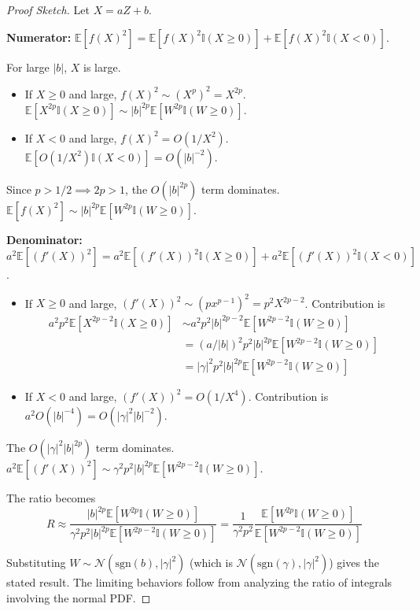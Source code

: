 \documentclass[11pt]{article}
\begin{document}
\begin{proof}[Proof Sketch]
Let $X = aZ+b$.

\textbf{Numerator:} $\mathbb{E}[f(X)^2] = \mathbb{E}[f(X)^2 \mathbb{I}(X \ge 0)] + \mathbb{E}[f(X)^2 \mathbb{I}(X < 0)]$.

For large $|b|$, $X$ is large.
\begin{itemize}
    \item If $X \ge 0$ and large, $f(X)^2 \sim (X^p)^2 = X^{2p}$. $\mathbb{E}[X^{2p}\mathbb{I}(X \ge 0)] \sim |b|^{2p}\mathbb{E}[W^{2p}\mathbb{I}(W \ge 0)]$.
    \item If $X < 0$ and large, $f(X)^2 = O(1/X^2)$. $\mathbb{E}[O(1/X^2)\mathbb{I}(X < 0)] = O(|b|^{-2})$.
\end{itemize}

Since $p > 1/2 \implies 2p > 1$, the $O(|b|^{2p})$ term dominates.
$\mathbb{E}[f(X)^2] \sim |b|^{2p} \mathbb{E}[W^{2p} \mathbb{I}(W \ge 0)]$.

\textbf{Denominator:} $a^2 \mathbb{E}[(f'(X))^2] = a^2 \mathbb{E}[(f'(X))^2 \mathbb{I}(X \ge 0)] + a^2 \mathbb{E}[(f'(X))^2 \mathbb{I}(X < 0)]$.

\begin{itemize}
    \item If $X \ge 0$ and large, $(f'(X))^2 \sim (px^{p-1})^2 = p^2 X^{2p-2}$. Contribution is 
    \begin{align}
    a^2 p^2 \mathbb{E}[X^{2p-2}\mathbb{I}(X \ge 0)] &\sim a^2 p^2 |b|^{2p-2}\mathbb{E}[W^{2p-2}\mathbb{I}(W \ge 0)] \\
    &= (a/|b|)^2 p^2 |b|^{2p} \mathbb{E}[W^{2p-2}\mathbb{I}(W \ge 0)] \\
    &= |\gamma|^2 p^2 |b|^{2p} \mathbb{E}[W^{2p-2}\mathbb{I}(W \ge 0)]
    \end{align}
    \item If $X < 0$ and large, $(f'(X))^2 = O(1/X^4)$. Contribution is $a^2 O(|b|^{-4}) = O(|\gamma|^2 |b|^{-2})$.
\end{itemize}

The $O(|\gamma|^2 |b|^{2p})$ term dominates.
$a^2 \mathbb{E}[(f'(X))^2] \sim \gamma^2 p^2 |b|^{2p} \mathbb{E}[W^{2p-2} \mathbb{I}(W \ge 0)]$.

The ratio becomes 
$$R \approx \frac{|b|^{2p} \mathbb{E}[W^{2p} \mathbb{I}(W \ge 0)]}{\gamma^2 p^2 |b|^{2p} \mathbb{E}[W^{2p-2} \mathbb{I}(W \ge 0)]} = \frac{1}{\gamma^2 p^2} \frac{\mathbb{E}[W^{2p} \mathbb{I}(W \ge 0)]}{\mathbb{E}[W^{2p-2} \mathbb{I}(W \ge 0)]}$$

Substituting $W \sim \mathcal{N}(\text{sgn}(b), |\gamma|^2)$ (which is $\mathcal{N}(\text{sgn}(\gamma), |\gamma|^2)$) gives the stated result. The limiting behaviors follow from analyzing the ratio of integrals involving the normal PDF.
\end{proof}
\end{document}
